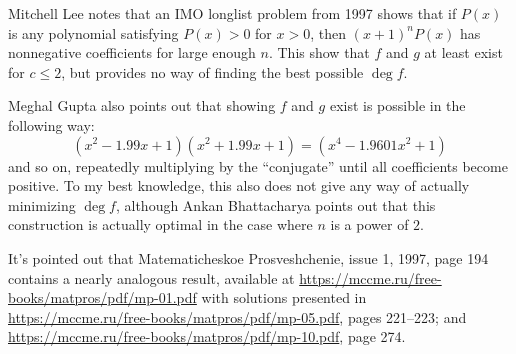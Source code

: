 \begin{remark*}
  Mitchell Lee notes that an IMO longlist problem from 1997 shows that
  if $P(x)$ is any polynomial satisfying $P(x) > 0$ for $x > 0$,
  then $(x+1)^n P(x)$ has nonnegative coefficients
  for large enough $n$.
  This show that $f$ and $g$ at least exist for $c \le 2$,
  but provides no way of finding the best possible $\deg f$.

  Meghal Gupta also points out that showing $f$ and $g$ exist
  is possible in the following way:
  \[ \left( x^2-1.99x+1 \right) \left( x^2+1.99x+1 \right)
    = \left( x^4 - 1.9601x^2 + 1 \right) \]
  and so on, repeatedly multiplying by the ``conjugate''
  until all coefficients become positive.
  To my best knowledge, this also does not give any way
  of actually minimizing $\deg f$,
  although Ankan Bhattacharya points out that this construction
  is actually optimal in the case where $n$ is a power of $2$.
\end{remark*}

\begin{remark*}
  It's pointed out that Matematicheskoe Prosveshchenie, issue 1, 1997, page 194
  contains a nearly analogous result,
  available at \url{https://mccme.ru/free-books/matpros/pdf/mp-01.pdf}
  with solutions presented in \url{https://mccme.ru/free-books/matpros/pdf/mp-05.pdf},
  pages 221--223;
  and \url{https://mccme.ru/free-books/matpros/pdf/mp-10.pdf}, page 274.
\end{remark*}
